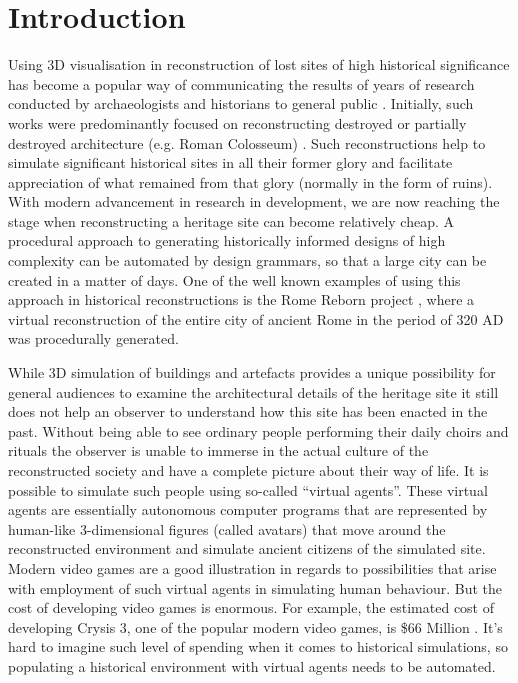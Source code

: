 \documentclass[graybox]{svmult}
\begin{document}
\section{Introduction}


Using 3D visualisation in reconstruction of lost sites of high historical significance has become a popular way of communicating the results of years of research conducted by archaeologists and historians  to general public \cite{Heritage_trends}. Initially, such works were predominantly focused on reconstructing destroyed or partially destroyed architecture (e.g. Roman Colosseum) \cite{Colosseum_crowds}. Such reconstructions help to simulate significant historical sites in all their former glory and facilitate appreciation of what remained from that glory (normally in the form of ruins).  With modern advancement in research in development, we are now reaching the stage when reconstructing a heritage site can become relatively cheap. A procedural approach to generating historically informed designs of high complexity can be automated by design grammars, so that a large city can be created in a matter of days.  One of the well known examples of using this approach in historical reconstructions is the Rome Reborn project \cite {rome_reborn}, where a virtual reconstruction of the entire city of ancient Rome in the period of 320 AD was procedurally generated.

While 3D simulation of buildings and artefacts provides a unique possibility for general audiences to examine the architectural details of the heritage site it still does not help an observer to understand how this site has been enacted in the past. Without being able to see ordinary people performing their daily choirs and rituals the observer is unable to immerse in the actual culture of the reconstructed society and have a complete picture about their way of life. It is possible to simulate such people using so-called ``virtual agents''. These virtual agents are essentially autonomous computer programs that are represented by human-like 3-dimensional figures (called avatars) that move around the reconstructed environment and simulate ancient citizens of the simulated site.  Modern video games are a good illustration in regards to possibilities that arise with employment of such virtual agents in simulating human behaviour. But the cost of developing video games is enormous. For example, the estimated cost of developing Crysis 3, one of the popular modern video games, is \$66 Million \cite{Crysis_development_cost}. It's hard to imagine such level of spending when it comes to historical simulations, so populating a historical environment with virtual agents needs to be automated.
\end{document}
